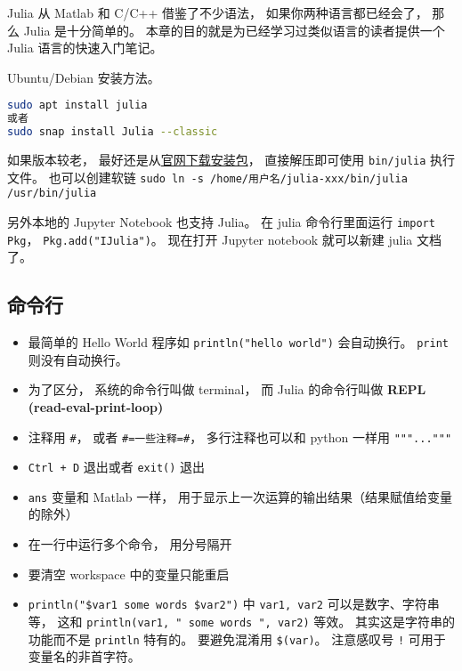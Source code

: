 
\begin{issues}
\issueDraft
\end{issues}

Julia 从 Matlab 和 C/C++ 借鉴了不少语法， 如果你两种语言都已经会了， 那么 Julia 是十分简单的。 本章的目的就是为已经学习过类似语言的读者提供一个 Julia 语言的快速入门笔记。

Ubuntu/Debian 安装方法。
\begin{lstlisting}[language=bash]
sudo apt install julia
或者
sudo snap install Julia --classic
\end{lstlisting}
如果版本较老， 最好还是从\href{https://julialang.org/downloads}{官网下载安装包}， 直接解压即可使用 \verb|bin/julia| 执行文件。 也可以创建软链 \verb|sudo ln -s /home/用户名/julia-xxx/bin/julia /usr/bin/julia|

另外本地的 Jupyter Notebook 也支持 Julia。 在 julia 命令行里面运行 \verb|import Pkg|， \verb|Pkg.add("IJulia")|。 现在打开 Jupyter notebook 就可以新建 julia 文档了。

\subsection{命令行}
\begin{itemize}
\item 最简单的 Hello World 程序如 \verb|println("hello world")| 会自动换行。 \verb|print| 则没有自动换行。

\item 为了区分， 系统的命令行叫做 terminal， 而 Julia 的命令行叫做 \textbf{REPL (read-eval-print-loop)}
\item 注释用 \verb|#|， 或者 \verb|#=一些注释=#|， 多行注释也可以和 python 一样用 \verb|"""..."""|
\item \verb|Ctrl + D| 退出或者 \verb|exit()| 退出
\item \verb|ans| 变量和 Matlab 一样， 用于显示上一次运算的输出结果（结果赋值给变量的除外）
\item 在一行中运行多个命令， 用分号隔开
\item 要清空 workspace 中的变量只能重启
\item \verb|println("$var1 some words $var2")| 中 \verb|var1, var2| 可以是数字、字符串等， 这和 \verb|println(var1, " some words ", var2)| 等效。 其实这是字符串的功能而不是 \verb|println| 特有的。 要避免混淆用 \verb|$(var)|。 注意感叹号 \verb|!| 可用于变量名的非首字符。
\end{itemize}

